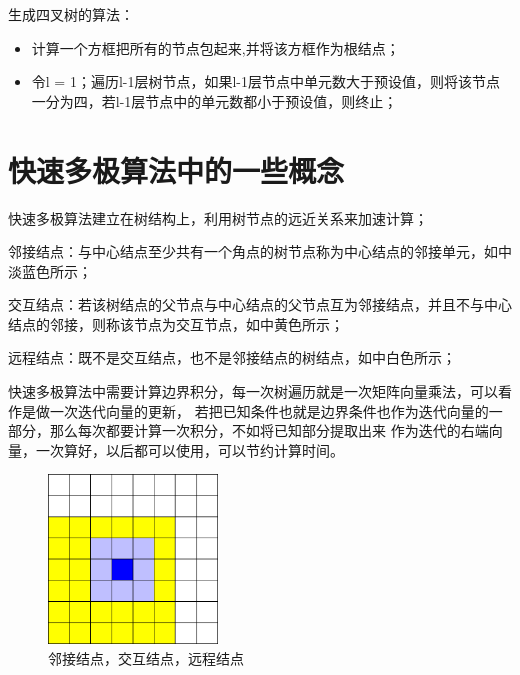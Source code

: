 生成四叉树的算法：
\begin{itemize}
	\item 计算一个方框把所有的节点包起来,并将该方框作为根结点；
	\item 令l = 1；遍历l-1层树节点，如果l-1层节点中单元数大于预设值，则将该节点一分为四，若l-1层节点中的单元数都小于预设值，则终止；
\end{itemize}



\section{快速多极算法中的一些概念}

快速多极算法建立在树结构上，利用树节点的远近关系来加速计算；

\begin{definition}
	邻接结点：与中心结点至少共有一个角点的树节点称为中心结点的邻接单元，如中淡蓝色所示； 
\end{definition}

\begin{definition}
	交互结点：若该树结点的父节点与中心结点的父节点互为邻接结点，并且不与中心结点的邻接，则称该节点为交互节点，如中黄色所示；
\end{definition}

\begin{definition}
	远程结点：既不是交互结点，也不是邻接结点的树结点，如中白色所示；
\end{definition}

快速多极算法中需要计算边界积分，每一次树遍历就是一次矩阵向量乘法，可以看作是做一次迭代向量的更新，
若把已知条件也就是边界条件也作为迭代向量的一部分，那么每次都要计算一次积分，不如将已知部分提取出来
作为迭代的右端向量，一次算好，以后都可以使用，可以节约计算时间。

\begin{figure}[htbp]
	\begin{center}
		\includegraphics[width=0.4\textwidth]{pics/nabor.eps}
	\end{center}
	\caption{邻接结点，交互结点，远程结点}
	\label{fignodetype}
\end{figure}

